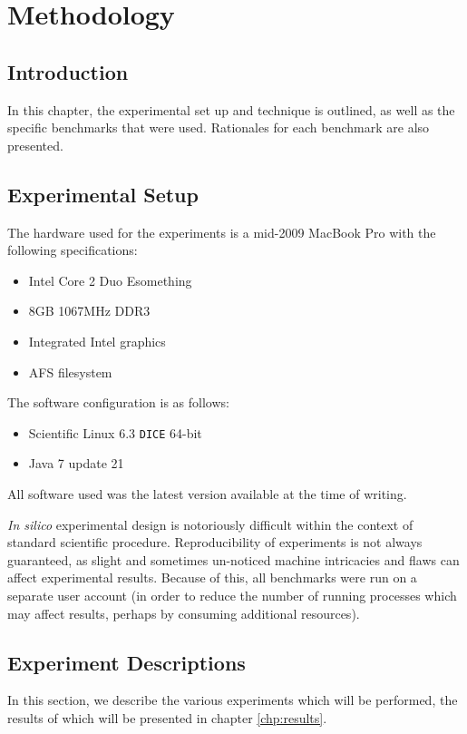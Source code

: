 \chapter{Methodology} \label{chp:methodology}
\section{Introduction} \label{sec:methodology/introduction}
In this chapter, the experimental set up and technique is outlined, as well as the specific benchmarks that were used. Rationales for each benchmark are also presented.

\section{Experimental Setup} \label{sec:methodology/setup}
The hardware used for the experiments is a mid-2009 MacBook Pro with the following specifications:
	
\begin{itemize}
	\item Intel Core 2 Duo Esomething
	\item 8GB 1067MHz DDR3
	\item Integrated Intel graphics
	\item AFS filesystem
\end{itemize}

The software configuration is as follows:
\begin{itemize}
	\item Scientific Linux 6.3 \texttt{DICE} 64-bit
	\item Java 7 update 21
\end{itemize}

All software used was the latest version available at the time of writing.

\textit{In silico} experimental design is notoriously difficult within the context of standard scientific procedure. Reproducibility of experiments is not always guaranteed, as slight and sometimes un-noticed machine intricacies and flaws can affect experimental results. Because of this, all benchmarks were run on a separate user account (in order to reduce the number of running processes which may affect results, perhaps by consuming additional resources).

\section{Experiment Descriptions} \label{sec:methodology/experiments}
In this section, we describe the various experiments which will be performed, the results of which will be presented in chapter \ref{chp:results}.

